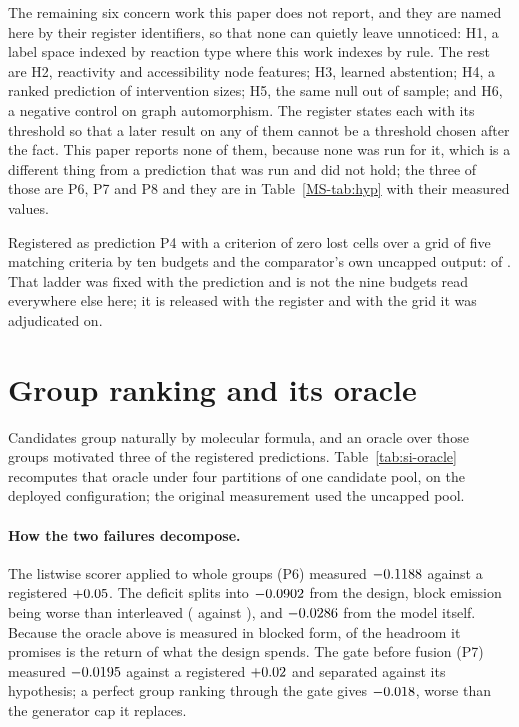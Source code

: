 \documentclass[journal=jcisd8,manuscript=suppinfo,layout=onecolumn]{achemso}
\begin{document}
The remaining six concern work this paper does not report, and they are named here by their
register identifiers, so that none can quietly leave unnoticed: H1, a label space indexed by
reaction type where this work indexes by rule. The rest are H2, reactivity and accessibility node
features; H3, learned abstention; H4, a ranked prediction of intervention sizes; H5, the same null
out of sample; and H6, a negative control on graph automorphism. The register states each with its threshold so that a
later
result on any of them cannot be a threshold chosen after the fact. This paper reports none of them,
because none was run for it, which is a different thing from a prediction that was run and did
not hold; the three of those are P6, P7 and P8 and they are in Table~\ref{MS-tab:hyp} with their
measured
values.


Registered as prediction P4 with a criterion of zero lost cells
over a grid of five matching criteria by ten budgets and the comparator's own uncapped output:
\numHOneOneLost{} of \numHOneOneCells{}. That ladder was fixed with the prediction and is not the
nine budgets read everywhere else here; it is released with the register and with the grid it was
adjudicated on.
\section{Group ranking and its oracle}
\label{sec:si-oracle}



Candidates group naturally by molecular formula, and an oracle over those groups motivated three
of the registered predictions. Table~\ref{tab:si-oracle} recomputes that oracle under four
partitions of one candidate pool, on the deployed configuration; the original measurement used
the uncapped pool.

\paragraph{How the two failures decompose.} The listwise scorer applied to whole groups (P6)
measured $-0.1188$ against a registered $+0.05$. The deficit splits into
$-0.0902$ from the design, block emission being worse than interleaved
(\numHEightBlocked{} against \numHEightInterleaved{}), and $-0.0286$ from the model
itself. Because the oracle above is measured in blocked form,
\numHEightDesignShare{} of the headroom it promises is the return of what the design spends.
The gate before fusion (P7) measured $-0.0195$ against a registered
$+0.02$ and separated against its hypothesis; a perfect group ranking through
the gate gives $-0.018$, worse than the generator cap it replaces.
\end{document}
